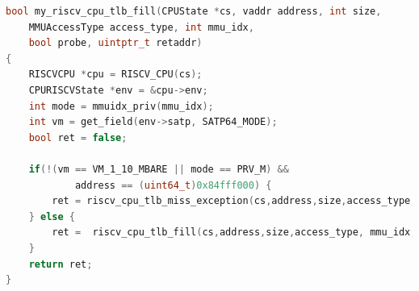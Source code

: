 \begin{lstlisting}[language=c,float=h!,
    caption={Alternative Implementation for the RISC-V tlb\_fill function with a special case to
    start testing TLB Miss Handler implementations.\\
    In line 11, a conditional branch is used to only trigger the exception when neither the
    Virtual Memory (as set in the \texttt{satp} \texttt{MODE} field) is bare nor the priviledge
    mode is the machine mode.\\
    If the virtual address is the hardcoded one, a TLB Miss exception is thrown, otherwise the
    original functions is called, which will perform a page table walk to find the mapping.},
    label={lst:specialCaseTLBfill}]
bool my_riscv_cpu_tlb_fill(CPUState *cs, vaddr address, int size,
    MMUAccessType access_type, int mmu_idx,
    bool probe, uintptr_t retaddr)
{
    RISCVCPU *cpu = RISCV_CPU(cs);
    CPURISCVState *env = &cpu->env;
    int mode = mmuidx_priv(mmu_idx);
    int vm = get_field(env->satp, SATP64_MODE);
    bool ret = false;

    if(!(vm == VM_1_10_MBARE || mode == PRV_M) &&
            address == (uint64_t)0x84fff000) {
        ret = riscv_cpu_tlb_miss_exception(cs,address,size,access_type, mmu_idx, probe, retaddr);
    } else {
        ret =  riscv_cpu_tlb_fill(cs,address,size,access_type, mmu_idx, probe, retaddr);
    }
    return ret;
}
\end{lstlisting}



